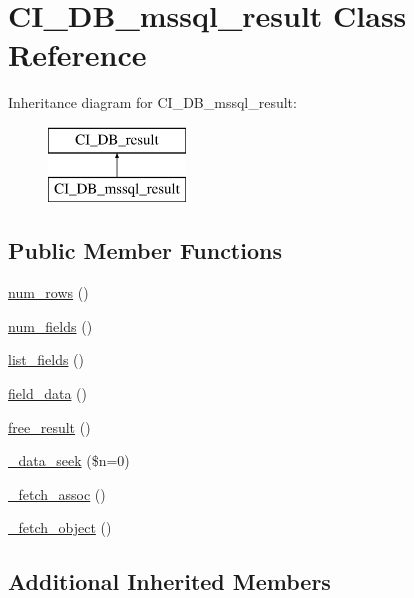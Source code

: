 \hypertarget{class_c_i___d_b__mssql__result}{\section{C\-I\-\_\-\-D\-B\-\_\-mssql\-\_\-result Class Reference}
\label{class_c_i___d_b__mssql__result}
}
Inheritance diagram for C\-I\-\_\-\-D\-B\-\_\-mssql\-\_\-result\-:\begin{figure}[H]
\begin{center}
\leavevmode
\includegraphics[height=2.000000cm]{class_c_i___d_b__mssql__result}
\end{center}
\end{figure}
\subsection*{Public Member Functions}
\begin{DoxyCompactItemize}
\item 
\hyperlink{class_c_i___d_b__mssql__result_a218657c303ee499b97710ab0cd2f5d6e}{num\-\_\-rows} ()
\item 
\hyperlink{class_c_i___d_b__mssql__result_af831bf363e4d7d661a717a4932af449d}{num\-\_\-fields} ()
\item 
\hyperlink{class_c_i___d_b__mssql__result_a50b54eb4ea7cfd039740f532988ea776}{list\-\_\-fields} ()
\item 
\hyperlink{class_c_i___d_b__mssql__result_a84bffd65e53902ade1591716749a33e3}{field\-\_\-data} ()
\item 
\hyperlink{class_c_i___d_b__mssql__result_aad2d98d6beb3d6095405356c6107b473}{free\-\_\-result} ()
\item 
\hyperlink{class_c_i___d_b__mssql__result_aeba9dd69307793342d1c81ccb3e55ff9}{\-\_\-data\-\_\-seek} (\$n=0)
\item 
\hyperlink{class_c_i___d_b__mssql__result_a43a9a92817f1334a1c10752ec44275a0}{\-\_\-fetch\-\_\-assoc} ()
\item 
\hyperlink{class_c_i___d_b__mssql__result_a236bae79bb43606aa86598719b281c1f}{\-\_\-fetch\-\_\-object} ()
\end{DoxyCompactItemize}
\subsection*{Additional Inherited Members}


